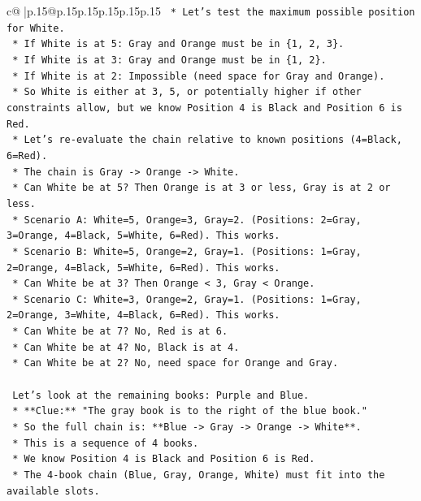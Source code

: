 \documentclass{article}
\begin{document}
{\begin{supertabular}{c@{$\;$}|p{.15\linewidth}@{}p{.15\linewidth}p{.15\linewidth}p{.15\linewidth}p{.15\linewidth}p{.15\linewidth}}
{{{\texttt{    *   Let's test the maximum possible position for White.} \\
\texttt{        *   If White is at 5: Gray and Orange must be in \{1, 2, 3\}.} \\
\texttt{        *   If White is at 3: Gray and Orange must be in \{1, 2\}.} \\
\texttt{        *   If White is at 2: Impossible (need space for Gray and Orange).} \\
\texttt{    *   So White is either at 3, 5, or potentially higher if other constraints allow, but we know Position 4 is Black and Position 6 is Red.} \\
\texttt{    *   Let's re{-}evaluate the chain relative to known positions (4=Black, 6=Red).} \\
\texttt{    *   The chain is Gray {-}> Orange {-}> White.} \\
\texttt{    *   Can White be at 5? Then Orange is at 3 or less, Gray is at 2 or less.} \\
\texttt{        *   Scenario A: White=5, Orange=3, Gray=2. (Positions: 2=Gray, 3=Orange, 4=Black, 5=White, 6=Red). This works.} \\
\texttt{        *   Scenario B: White=5, Orange=2, Gray=1. (Positions: 1=Gray, 2=Orange, 4=Black, 5=White, 6=Red). This works.} \\
\texttt{    *   Can White be at 3? Then Orange < 3, Gray < Orange.} \\
\texttt{        *   Scenario C: White=3, Orange=2, Gray=1. (Positions: 1=Gray, 2=Orange, 3=White, 4=Black, 6=Red). This works.} \\
\texttt{    *   Can White be at 7? No, Red is at 6.} \\
\texttt{    *   Can White be at 4? No, Black is at 4.} \\
\texttt{    *   Can White be at 2? No, need space for Orange and Gray.} \\
\\ 
\texttt{    Let's look at the remaining books: Purple and Blue.} \\
\texttt{    *   **Clue:** "The gray book is to the right of the blue book."} \\
\texttt{    *   So the full chain is: **Blue {-}> Gray {-}> Orange {-}> White**.} \\
\texttt{    *   This is a sequence of 4 books.} \\
\texttt{    *   We know Position 4 is Black and Position 6 is Red.} \\
\texttt{    *   The 4{-}book chain (Blue, Gray, Orange, White) must fit into the available slots.} \\
}}}
\end{supertabular}}
\end{document}
